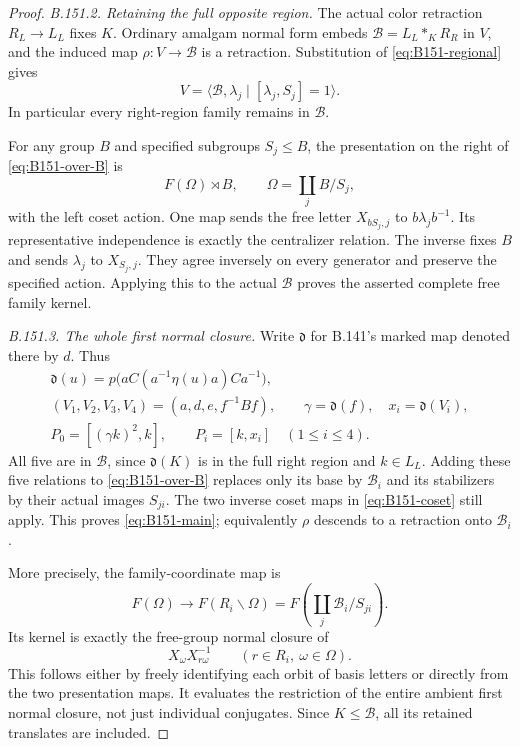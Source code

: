 \begin{proof}
\emph{B.151.2. Retaining the full opposite region.}
The actual color retraction \(R_L\to L_L\) fixes \(K\).
Ordinary amalgam normal form embeds
\(\mathcal B=L_L*_KR_R\) in \(V\), and the induced map
\(\rho:V\to\mathcal B\) is a retraction. Substitution of
\eqref{eq:B151-regional} gives
\begin{equation}\label{eq:B151-over-B}
 V=\langle\mathcal B,\lambda_j\mid[\lambda_j,S_j]=1\rangle.
\end{equation}
In particular every right-region family remains in \(\mathcal B\).

For any group \(B\) and specified subgroups \(S_j\le B\),
the presentation on the right of \eqref{eq:B151-over-B} is
\begin{equation}\label{eq:B151-coset}
 F(\Omega)\rtimes B,\qquad \Omega=\coprod_j B/S_j,
\end{equation}
with the left coset action. One map sends the free letter
\(X_{bS_j,j}\) to \(b\lambda_jb^{-1}\). Its representative
independence is exactly the centralizer relation. The inverse
fixes \(B\) and sends \(\lambda_j\) to \(X_{S_j,j}\).
They agree inversely on every generator and preserve the
specified action. Applying this to the actual \(\mathcal B\)
proves the asserted complete free family kernel.

\emph{B.151.3. The whole first normal closure.}
Write \(\mathfrak d\) for B.141's marked map denoted there by \(d\).
Thus
\begin{equation}\label{eq:B151-words}
\begin{gathered}
 \mathfrak d(u)=p\bigl(aC(a^{-1}\eta(u)a)Ca^{-1}\bigr),\\
 (V_1,V_2,V_3,V_4)=(a,d,e,f^{-1}Bf),\qquad
 \gamma=\mathfrak d(f),\quad x_i=\mathfrak d(V_i),\\
 P_0=[(\gamma k)^2,k],\qquad P_i=[k,x_i]\quad(1\le i\le4).
\end{gathered}
\end{equation}
All five are in \(\mathcal B\), since \(\mathfrak d(K)\)
is in the full right region and \(k\in L_L\).
Adding these five relations to \eqref{eq:B151-over-B}
replaces only its base by \(\mathcal B_i\) and its stabilizers
by their actual images \(S_{ji}\). The two inverse coset maps
in \eqref{eq:B151-coset} still apply. This proves
\eqref{eq:B151-main}; equivalently \(\rho\) descends to a
retraction onto \(\mathcal B_i\).

More precisely, the family-coordinate map is
\[
 F(\Omega)\longrightarrow F(R_i\backslash\Omega)
                  =F\left(\coprod_j\mathcal B_i/S_{ji}\right).
\]
Its kernel is exactly the free-group normal closure of
\[
 X_\omega X_{r\omega}^{-1}
       \qquad(r\in R_i,\ \omega\in\Omega).
\]
This follows either by freely identifying each orbit of basis
letters or directly from the two presentation maps. It evaluates
the restriction of the entire ambient first normal closure,
not just individual conjugates. Since \(K\le\mathcal B\),
all its retained translates are included.


\end{proof}
